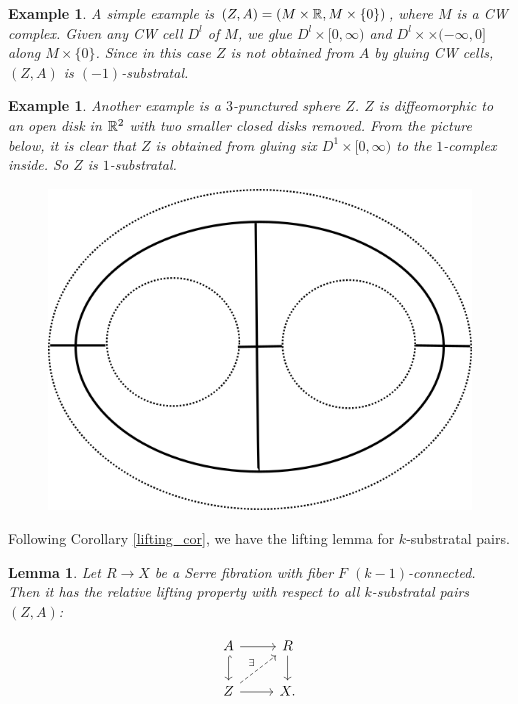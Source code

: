 \documentclass{article}
\newtheorem{lemma}[theorem]{Lemma}
\newtheorem{example}[theorem]{Example}
\newtheorem{proposed work}[theorem]{Proposed Work}
\begin{document}
\begin{example}
A simple example is $(Z,A) = (M\times\mathbb R,M\times\{0\})$, where $M$ is a CW complex. Given any CW cell $D^l$ of $M$, we glue $D^l\times [0,\infty)$ and $D^l\times\times (-\infty,0]$ along $M\times \{0\}$. Since in this case $Z$ is not obtained from $A$ by gluing CW cells, $(Z,A)$ is $(-1)$-substratal.
\end{example}

\begin{example}
Another example is a $3$-punctured sphere $Z$. $Z$ is diffeomorphic to an open disk in $\mathbb R^2$ with two smaller closed disks removed. From the picture below, it is clear that $Z$ is obtained from gluing six $D^1\times [0,\infty)$ to the $1$-complex inside. So $Z$ is $1$-substratal.
\begin{figure}[h]
\includegraphics[scale=0.3]{3punctured}
\centering
\end{figure}
\end{example}

Following Corollary \ref{lifting_cor}, we have the lifting lemma for $k$-substratal pairs.

\begin{lemma}
\label{substratal_lift}
Let $R\to X$ be a Serre fibration with fiber $F$ $(k-1)$-connected. Then it has the relative lifting property with respect to all $k$-substratal pairs $(Z, A)$:

\begin{equation*}
\begin{tikzcd}
A \arrow[r] \arrow[hookrightarrow]{d}
& R \arrow[d]
\\
Z \arrow[r] \arrow[dashed,ur,"\exists"]
& X.
\end{tikzcd}
\end{equation*}
\end{lemma}
\end{document}
